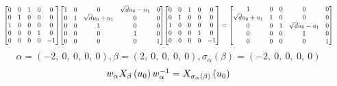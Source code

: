 \documentclass[11pt]{article}
\theoremstyle{definition}
\begin{document}
\[
\scaletoalign{\textwidth}{{\left[\begin{matrix}0 & 0 & 1 & 0 & 0\\0 & 1 & 0 & 0 & 0\\1 & 0 & 0 & 0 & 0\\0 & 0 & 0 & 1 & 0\\0 & 0 & 0 & 0 & -1\end{matrix}\right]} {\left[\begin{matrix}1 & 0 & 0 & \sqrt{d} u_{0} - u_{1} & 0\\0 & 1 & \sqrt{d} u_{0} + u_{1} & 0 & 0\\0 & 0 & 1 & 0 & 0\\0 & 0 & 0 & 1 & 0\\0 & 0 & 0 & 0 & 1\end{matrix}\right]} {\left[\begin{matrix}0 & 0 & 1 & 0 & 0\\0 & 1 & 0 & 0 & 0\\1 & 0 & 0 & 0 & 0\\0 & 0 & 0 & 1 & 0\\0 & 0 & 0 & 0 & -1\end{matrix}\right]} = {\left[\begin{matrix}1 & 0 & 0 & 0 & 0\\\sqrt{d} u_{0} + u_{1} & 1 & 0 & 0 & 0\\0 & 0 & 1 & \sqrt{d} u_{0} - u_{1} & 0\\0 & 0 & 0 & 1 & 0\\0 & 0 & 0 & 0 & 1\end{matrix}\right]}}
\]
\[
\alpha = \left( -2, \  0, \  0, \  0, \  0\right), \beta = \left( 2, \  0, \  0, \  0, \  0\right), \sigma_{\alpha}(\beta) = \left( -2, \  0, \  0, \  0, \  0\right)
\]
\[
\scaletoalign{\textwidth}{w_{\alpha} X_{\beta}\left(u_{0}\right) w_{\alpha}^{-1} = X_{\sigma_{\alpha}\left(\beta\right)}\left(u_{0}\right)}
\]
\end{document}
